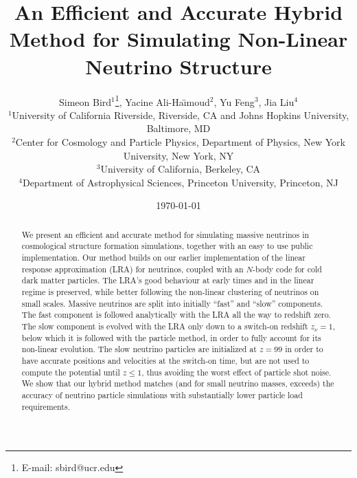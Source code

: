 \documentclass[useAMS, usenatbib]{mnras}
\begin{document}
\title{An Efficient and Accurate Hybrid Method for Simulating Non-Linear Neutrino Structure}
\author[ S. Bird et al.]{Simeon Bird$^1$\thanks{E-mail: sbird@ucr.edu}, Yacine Ali-Ha\"{\i}moud$^2$, Yu Feng$^3$, Jia Liu$^4$\vspace{1.5mm}\\
$^1$University of California Riverside, Riverside, CA  and Johns Hopkins University, Baltimore, MD\\
$^2$Center for Cosmology and Particle Physics, Department of Physics,
New York University, New York, NY\\
$^3$University of California, Berkeley, CA\\
$^4$Department of Astrophysical Sciences, Princeton University, Princeton, NJ
}

\date{\today}

\pagerange{\pageref{firstpage}--\pageref{lastpage}} 
\label{firstpage}

\maketitle

\begin{abstract}
We present an efficient and accurate method for simulating massive neutrinos in cosmological structure formation simulations, together with an easy to use public implementation. Our method builds on our earlier implementation of the linear response approximation (LRA)
for neutrinos, coupled with an $N$-body code for cold dark matter particles. The LRA's good behaviour at early times and in the linear regime is preserved, while better following the non-linear clustering of neutrinos on small scales. Massive neutrinos are split into initially ``fast'' and ``slow'' components. The fast component is followed analytically with the LRA all the way to redshift zero. The slow component is evolved with the LRA only down to a switch-on redshift $z_\nu = 1$, below which it is followed with the particle method, in order to fully account for its non-linear evolution. The slow neutrino particles are initialized at $z = 99$ in order to have accurate positions and velocities at the switch-on time, but are not used to compute the potential until $z \leq 1$, thus avoiding the worst effect of particle shot noise. We show that our hybrid method matches (and for small neutrino masses, exceeds) the accuracy of neutrino particle simulations with substantially lower particle load requirements.
\end{abstract}
\end{document}
